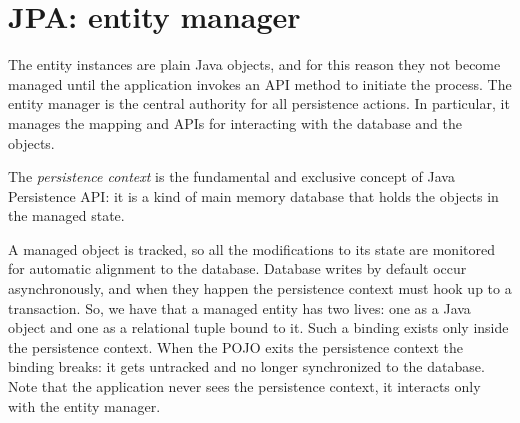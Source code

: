 \section{JPA: entity manager}

The entity instances are plain Java objects, and for this reason they not become managed until the application invokes an API method to initiate the process. The
entity manager is the central authority for all persistence actions. In particular, it manages the mapping and APIs for interacting with the database and the objects. 
\begin{definition}
    The \emph{persistence context} is the fundamental and exclusive concept of Java Persistence API: it is a kind of main memory database that holds the objects in 
    the managed state. 
\end{definition}
A managed object is tracked, so all the modifications to its state are monitored for automatic alignment to the database. 
Database writes by default occur asynchronously, and when they happen the persistence context must hook up to a transaction. So, we have that a managed entity has two 
lives: one as a Java object and one as a relational tuple bound to it. Such a binding exists only inside the persistence context. When the POJO exits the persistence 
context the binding breaks: it gets untracked and no longer synchronized to the database. Note that the application never sees the persistence context, it interacts
only with the entity manager.


